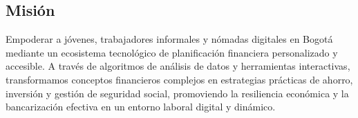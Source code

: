 \subsection*{Misión}
Empoderar a jóvenes, trabajadores informales y nómadas digitales en Bogotá mediante un ecosistema tecnológico de planificación financiera personalizado y accesible. A través de algoritmos de análisis de datos y herramientas interactivas, transformamos conceptos financieros complejos en estrategias prácticas de ahorro, inversión y gestión de seguridad social, promoviendo la resiliencia económica y la bancarización efectiva en un entorno laboral digital y dinámico.